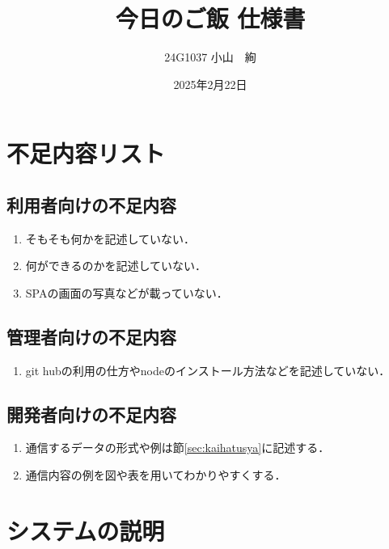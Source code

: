 \documentclass[uplatex,dvipdfmx]{jsarticle}
\begin{document}
\title{今日のご飯 仕様書} %
\author{24G1037 小山　絢}
\date{2025年2月22日}
\maketitle
\section{不足内容リスト}
\subsection{利用者向けの不足内容}
\begin{enumerate}
    \item そもそも何かを記述していない．
    \item 何ができるのかを記述していない．
    \item SPAの画面の写真などが載っていない．
\end{enumerate}
\subsection{管理者向けの不足内容}
\begin{enumerate}
    \item git hubの利用の仕方やnodeのインストール方法などを記述していない．
\end{enumerate}
\subsection{開発者向けの不足内容}
\begin{enumerate}
    \item 通信するデータの形式や例は節\ref{sec:kaihatusya}に記述する．
    \item 通信内容の例を図や表を用いてわかりやすくする．
\end{enumerate}
\section{システムの説明}
\end{document}

